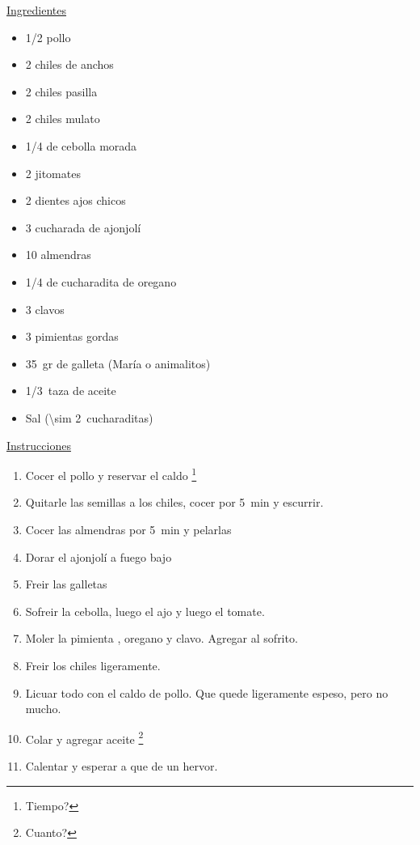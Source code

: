 \underline{Ingredientes}
\begin{itemize}
\item \num{1/2} pollo
\item 2 chiles de anchos
\item 2 chiles pasilla
\item 2 chiles mulato
\item \num{1/4} de cebolla morada
\item 2 jitomates
\item 2 dientes ajos chicos
\item 3 cucharada de ajonjolí
\item 10 almendras
\item \num{1/4} de cucharadita de oregano
\item 3 clavos
\item 3 pimientas gordas
\item \SI{35}{gr} de galleta (María o animalitos)
\item \SI{1/3}{taza} de aceite
\item Sal (\SI{\sim 2}{cucharaditas})
\end{itemize}

\underline{Instrucciones}
\begin{enumerate}
\item Cocer el pollo y reservar el caldo \footnote{Tiempo?}
\item Quitarle las semillas a los chiles, cocer por \SI{5}{min} y escurrir.
\item Cocer las almendras por \SI{5}{min} y pelarlas
\item Dorar el ajonjolí a fuego bajo
\item Freir las galletas
\item Sofreir la cebolla, luego el ajo y luego el tomate.
\item Moler la pimienta , oregano y clavo. Agregar al sofrito.
\item Freir los chiles ligeramente.
\item Licuar todo con el caldo de pollo. Que quede ligeramente espeso, pero no mucho.
\item Colar y agregar aceite \footnote{Cuanto?}
\item Calentar y esperar a que de un hervor.
\end{enumerate}